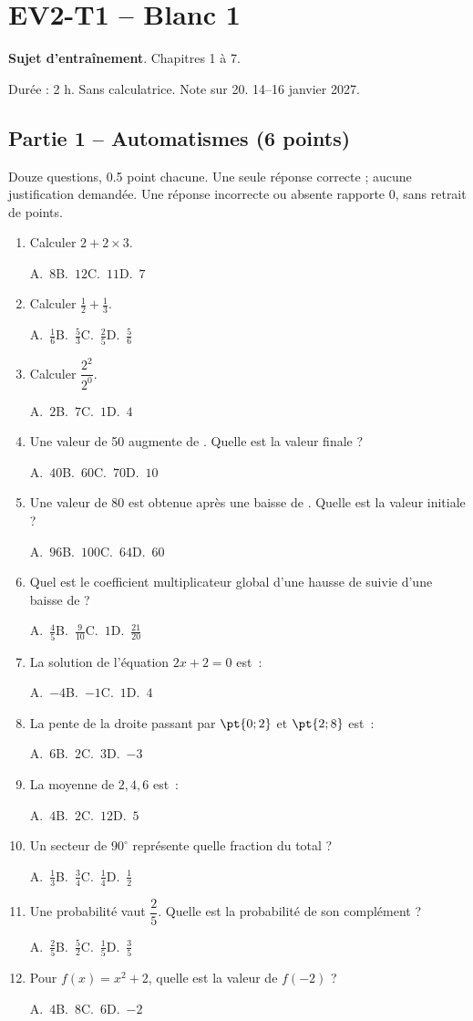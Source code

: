 \mxnewpage\section*{EV2-T1 -- Blanc 1}\label{EV2-T1}
\textbf{Sujet d’entraînement}. Chapitres 1 à 7.\par Durée : 2 h. Sans calculatrice. Note sur 20. 14–16 janvier 2027.
\subsection*{Partie 1 -- Automatismes (6 points)}
Douze questions, \num{0,5} point chacune. Une seule réponse correcte ; aucune justification demandée. Une réponse incorrecte ou absente rapporte 0, sans retrait de points.
\begin{enumerate}
\item Calculer $2+2\times3$.\par A.~$8$\quad B.~$12$\quad C.~$11$\quad D.~$7$
\item Calculer $\frac12+\frac13$.\par A.~$\frac{1}{6}$\quad B.~$\frac{5}{3}$\quad C.~$\frac{2}{5}$\quad D.~$\frac{5}{6}$
\item Calculer $\dfrac{2^2}{2^{0}}$.\par A.~$2$\quad B.~$7$\quad C.~$1$\quad D.~$4$
\item Une valeur de 50 augmente de . Quelle est la valeur finale ?\par A.~$40$\quad B.~$60$\quad C.~$70$\quad D.~$10$
\item Une valeur de 80 est obtenue après une baisse de . Quelle est la valeur initiale ?\par A.~$96$\quad B.~$100$\quad C.~$64$\quad D.~$60$
\item Quel est le coefficient multiplicateur global d'une hausse de  suivie d'une baisse de  ?\par A.~$\frac{4}{5}$\quad B.~$\frac{9}{10}$\quad C.~$1$\quad D.~$\frac{21}{20}$
\item La solution de l'équation $2x+2=0$ est~:\par A.~$-4$\quad B.~$-1$\quad C.~$1$\quad D.~$4$
\item La pente de la droite passant par $\pt{0;2}$ et $\pt{2;8}$ est~:\par A.~$6$\quad B.~$2$\quad C.~$3$\quad D.~$-3$
\item La moyenne de $2, 4, 6$ est~:\par A.~$4$\quad B.~$2$\quad C.~$12$\quad D.~$5$
\item Un secteur de $90^\circ$ représente quelle fraction du total ?\par A.~$\frac{1}{3}$\quad B.~$\frac{3}{4}$\quad C.~$\frac{1}{4}$\quad D.~$\frac{1}{2}$
\item Une probabilité vaut $\dfrac{2}{5}$. Quelle est la probabilité de son complément ?\par A.~$\frac{2}{5}$\quad B.~$\frac{5}{2}$\quad C.~$\frac{1}{5}$\quad D.~$\frac{3}{5}$
\item Pour $f(x)=x^2+2$, quelle est la valeur de $f(-2)$ ?\par A.~$4$\quad B.~$8$\quad C.~$6$\quad D.~$-2$
\end{enumerate}
